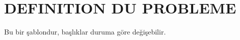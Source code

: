 \chapter{DEFINITION DU PROBLEME}
\thispagestyle{empty}

Bu bir şablondur, başlıklar duruma göre değişebilir.


\lipsum[1-5]
